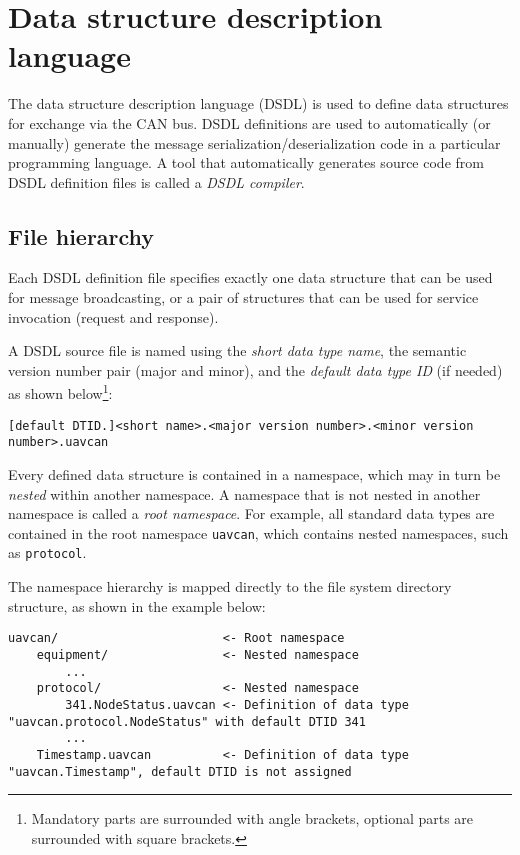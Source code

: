 \chapter{Data structure description language}\label{sec:dsdl}

The data structure description language (DSDL) is used to define data structures for exchange via the CAN bus.
DSDL definitions are used to automatically (or manually) generate the message serialization/deserialization code
in a particular programming language.
A tool that automatically generates source code from DSDL definition files is called a \emph{DSDL compiler}.

\section{File hierarchy}

Each DSDL definition file specifies exactly one data structure that can be used for message broadcasting,
or a pair of structures that can be used for service invocation (request and response).

A DSDL source file is named using the \emph{short data type name},
the semantic version number pair (major and minor),
and the \emph{default data type ID} (if needed) as shown
below\footnote{Mandatory parts are surrounded with angle brackets, optional parts are surrounded with square brackets.}:

\verb|[default DTID.]<short name>.<major version number>.<minor version number>.uavcan|

Every defined data structure is contained in a namespace,
which may in turn be \emph{nested} within another namespace.
A namespace that is not nested in another namespace is called a \emph{root namespace}.
For example, all standard data types are contained in the root namespace \verb|uavcan|,
which contains nested namespaces, such as \verb|protocol|.

The namespace hierarchy is mapped directly to the file system directory structure,
as shown in the example below:

\begin{verbatim}
uavcan/                       <- Root namespace
    equipment/                <- Nested namespace
        ...
    protocol/                 <- Nested namespace
        341.NodeStatus.uavcan <- Definition of data type "uavcan.protocol.NodeStatus" with default DTID 341
        ...
    Timestamp.uavcan          <- Definition of data type "uavcan.Timestamp", default DTID is not assigned
\end{verbatim}

